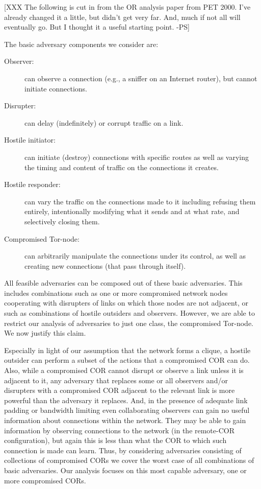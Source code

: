 \documentclass[times,10pt,twocolumn]{article}
\begin{document}
[XXX The following is cut in from the OR analysis paper from PET 2000.
I've already changed it a little, but didn't get very far.
And, much if not all will eventually
go. But I thought it a useful starting point. -PS]

The basic adversary components we consider are:
\begin{description}
\item[Observer:] can observe a connection (e.g., a sniffer on an
  Internet router), but cannot initiate connections.
\item[Disrupter:] can delay (indefinitely) or corrupt traffic on a
  link.
\item[Hostile initiator:] can initiate (destroy) connections with
  specific routes as well as varying the timing and content of traffic
  on the connections it creates.
\item[Hostile responder:] can vary the traffic on the connections made
  to it including refusing them entirely, intentionally modifying what
  it sends and at what rate, and selectively closing them.
\item[Compromised Tor-node:] can arbitrarily manipulate the connections
  under its control, as well as creating new connections (that pass
  through itself).
\end{description}


All feasible adversaries can be composed out of these basic
adversaries. This includes combinations such as one or more
compromised network nodes cooperating with disrupters of links on
which those nodes are not adjacent, or such as combinations of hostile
outsiders and observers.  However, we are able to restrict our
analysis of adversaries to just one class, the compromised Tor-node.
We now justify this claim.

Especially in light of our assumption that the network forms a clique,
a hostile outsider can perform a subset of the actions that a
compromised COR can do. Also, while a compromised COR cannot disrupt
or observe a link unless it is adjacent to it, any adversary that
replaces some or all observers and/or disrupters with a compromised
COR adjacent to the relevant link is more powerful than the adversary
it replaces. And, in the presence of adequate link padding or bandwidth
limiting even collaborating observers can gain no useful information about
connections within the network. They may be able to gain information
by observing connections to the network (in the remote-COR configuration),
but again this is less than what the COR to which such connection is made
can learn. Thus, by considering adversaries consisting of
collections of compromised CORs we cover the worst case of all
combinations of basic adversaries. Our analysis focuses on this most
capable adversary, one or more compromised CORs.
\end{document}
